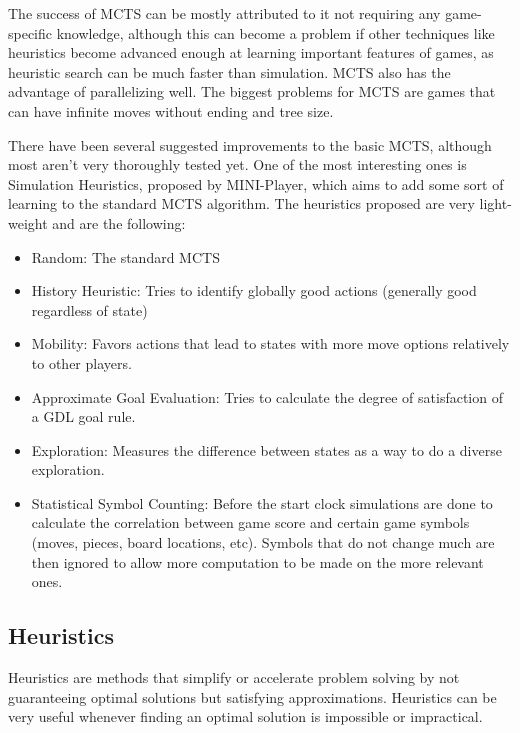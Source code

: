 The success of MCTS can be mostly attributed to it not requiring any game-specific knowledge, although this can become a problem if other techniques like heuristics become advanced enough at learning important features of games, as heuristic search can be much faster than simulation. MCTS also has the advantage of parallelizing well. The biggest problems for MCTS are games that can have infinite moves without ending and tree size.

There have been several suggested improvements to the basic MCTS, although most aren’t very thoroughly tested yet. One of the most interesting ones is Simulation Heuristics, proposed by MINI-Player, which aims to add some sort of learning to the standard MCTS algorithm. The heuristics proposed are very light-weight and are the following:

\begin{itemize}

\item Random: The standard MCTS

\item History Heuristic: Tries to identify globally good actions (generally good regardless of state)

\item Mobility: Favors actions that lead to states with more move options relatively to other players.

\item Approximate Goal Evaluation: Tries to calculate the degree of satisfaction of a GDL goal rule. 

\item Exploration: Measures the difference between states as a way to do a diverse exploration. 

\item Statistical Symbol Counting: Before the start clock simulations are done to calculate the correlation between game score and certain game symbols (moves, pieces, board locations, etc). Symbols that do not change much are then ignored to allow more computation to be made on the more relevant ones.

\end{itemize}

\subsection{Heuristics}
Heuristics are methods that simplify or accelerate problem solving by not guaranteeing optimal solutions but satisfying approximations. Heuristics can be very useful whenever finding an optimal solution is impossible or impractical.

